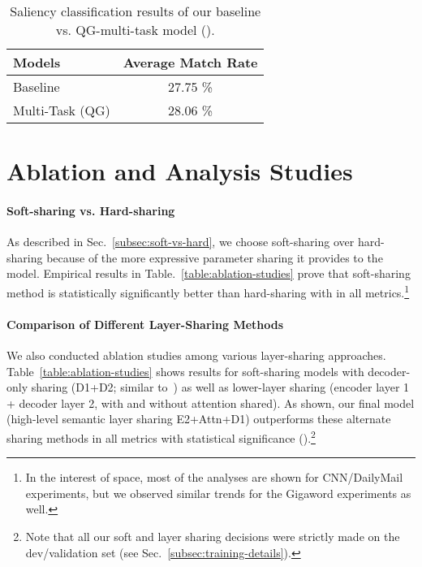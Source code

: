 \documentclass[11pt,a4paper]{article}
\begin{document}
\begin{table}[t]
\begin{small}
\begin{center}
\begin{tabular}{|l|c|}
\hline
Models & Average Match Rate \\
\hline
Baseline & 27.75 \% \\
Multi-Task (QG) & 28.06 \% \\
\hline
\end{tabular}
\end{center}
\vspace{-10pt}
\caption{Saliency classification results of our baseline vs. QG-multi-task model ().}
\label{table:saliency_results_2}
\vspace{-4pt}
\end{small}
\end{table}


\section{Ablation and Analysis Studies}
\label{sec:analysis}


\paragraph{Soft-sharing vs. Hard-sharing}
As described in Sec.~\ref{subsec:soft-vs-hard}, we choose soft-sharing over hard-sharing because of the more expressive parameter sharing it provides to the model. Empirical results in Table.~\ref{table:ablation-studies} prove that soft-sharing method is statistically significantly better than hard-sharing with  in all metrics.\footnote{In the interest of space, most of the analyses are shown for CNN/DailyMail experiments, but we observed similar trends for the Gigaword experiments as well.}



\paragraph{Comparison of Different Layer-Sharing Methods}
We also conducted ablation studies among various layer-sharing approaches. Table~\ref{table:ablation-studies} shows results for soft-sharing models with decoder-only sharing (D1+D2; similar to~) as well as lower-layer sharing (encoder layer 1 + decoder layer 2, with and without attention shared). As shown, our final model (high-level semantic layer sharing E2+Attn+D1) outperforms these alternate sharing methods in all metrics with statistical significance ().\footnote{Note that all our soft and layer sharing decisions were strictly made on the dev/validation set (see Sec.~\ref{subsec:training-details}).}
\end{document}
